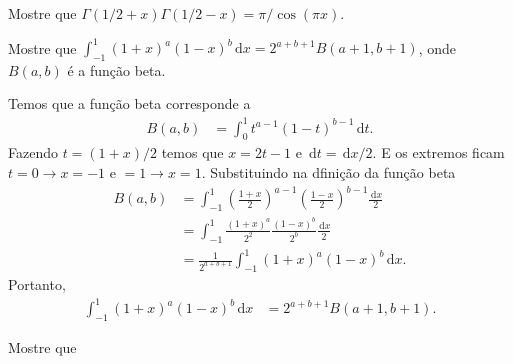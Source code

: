 \documentclass[a4paper,12pt, leqno, answers]{exam}
\begin{document}
\begin{questions}
    \question Mostre que $\Gamma(1/2 + x) \Gamma(1/2 - x) = \pi / \cos(\pi x)$.
    \begin{solution}
    \end{solution}

    \question Mostre que $\int_{-1}^1 \left( 1 + x \right)^a \left( 1 - x \right)^b \,\mathrm{d}x = 2^{a + b + 1} B(a + 1, b + 1)$, onde $B(a, b)$ \'{e} a fun\c{c}\~{a}o beta.
    \begin{solution}
        Temos que a fun\c{c}\~{a}o beta corresponde a
        \begin{align*}
            B(a, b) &= \int_0^1 t^{a - 1} (1 - t)^{b - 1} \,\mathrm{d}t.
        \end{align*}
        Fazendo $t = (1 + x)/2$ temos que $x = 2t - 1$ e $\,\mathrm{d}t = \,\mathrm{d}x/2$. E os extremos ficam $t = 0 \to x = -1$ e $ = 1 \to x = 1$. Substituindo na dfini\c{c}\~{a}o da fun\c{c}\~{a}o beta
        \begin{align*}
            B(a, b) &= \int_{-1}^1 \left( \frac{1 + x}{2} \right)^{a - 1} \left( \frac{1 - x}{2} \right)^{b - 1} \frac{\,\mathrm{d}x}{2} \\
            &= \int_{-1}^1 \frac{(1 + x)^a}{2^2} \frac{(1 - x)^b}{2^b} \frac{\,\mathrm{d}x}{2} \\
            &= \frac{1}{2^{a + b + 1}} \int_{-1}^1 (1 + x)^a (1 - x)^b \,\mathrm{d}x.
        \end{align*}
        Portanto,
        \begin{align*}
            \int_{-1}^1 (1 + x)^a (1 - x)^b \,\mathrm{d}x &= 2^{a + b + 1} B(a + 1, b + 1).
        \end{align*}
    \end{solution}

    \question Mostre que
\end{questions}
\end{document}
